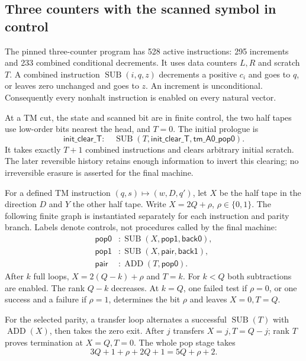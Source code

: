 \documentclass[11pt,a4paper]{article}
\numberwithin{equation}{section}
\begin{document}
\subsection{Three counters with the scanned symbol in control}
The pinned three-counter program has 528 active instructions: 295 increments
and 233 combined conditional decrements. It uses data counters $L,R$ and
scratch $T$. A combined instruction $\operatorname{SUB}(i,q,z)$ decrements a
positive $c_i$ and goes to $q$, or leaves zero unchanged and goes to $z$.
An increment is unconditional. Consequently every nonhalt instruction is
enabled on every natural vector.

At a TM cut, the state and scanned bit are in finite control, the two half
tapes use low-order bits nearest the head, and $T=0$. The initial prologue is
\[
 \mathsf{init\_clear\_T}:\quad
 \operatorname{SUB}(T,\mathsf{init\_clear\_T},\mathsf{tm\_A0\_pop0}).
                                                               \tag{3}
\]
It takes exactly $T+1$ combined instructions and clears arbitrary initial
scratch. The later reversible history retains enough information to invert
this clearing; no irreversible erasure is asserted for the final machine.

For a defined TM instruction $(q,s)\mapsto(w,D,q')$, let $X$ be the half
tape in the direction $D$ and $Y$ the other half tape. Write $X=2Q+\rho$,
$\rho\in\{0,1\}$. The following finite graph is instantiated separately for
each instruction and parity branch. Labels denote controls, not procedures
called by the final machine:
\begin{align*}
 \mathsf{pop0}&:\operatorname{SUB}(X,\mathsf{pop1},\mathsf{back0}),\\
 \mathsf{pop1}&:\operatorname{SUB}(X,\mathsf{pair},\mathsf{back1}),\\
 \mathsf{pair}&:\operatorname{ADD}(T,\mathsf{pop0}).
\end{align*}
After $k$ full loops, $X=2(Q-k)+\rho$ and $T=k$. For $k<Q$ both
subtractions are enabled. The rank $Q-k$ decreases. At $k=Q$, one failed test
if $\rho=0$, or one success and a failure if $\rho=1$, determines the bit
$\rho$ and leaves $X=0,T=Q$.

For the selected parity, a transfer loop alternates a successful
$\operatorname{SUB}(T)$ with $\operatorname{ADD}(X)$, then takes the zero exit.
After $j$ transfers $X=j,T=Q-j$; rank $T$ proves termination at $X=Q,T=0$.
The whole pop stage takes
\[
                    3Q+1+\rho+2Q+1=5Q+\rho+2.        \tag{4}
\]
\end{document}
